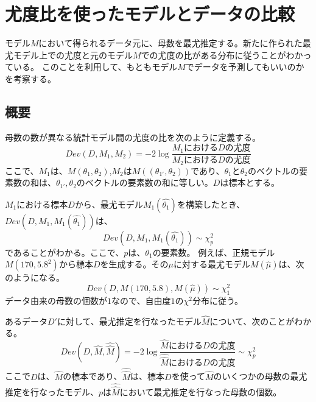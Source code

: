 \chapter{尤度比を使ったモデルとデータの比較}
モデル$M$において得られるデータ元に、母数を最尤推定する。新たに作られた最尤モデル上での尤度と元のモデル$M$での尤度の比がある分布に従うことがわかっている。
このことを利用して、もともモデル$M$でデータを予測してもいいのかを考察する。
\section{概要}

\begin{defi}
    母数の数が異なる統計モデル間の尤度の比を次のように定義する。
    \begin{equation*}
        Dev(D,M_1,M_2) = -2\log\frac{M_1におけるDの尤度}{M_2におけるDの尤度}
    \end{equation*}
    ここで、$M_1$は、$M(\theta_1,\theta_2)$,$M_2$は$M((\theta_{1'},\theta_2))$であり、$\theta_1$と$\theta_2$のベクトルの要素数の和は、$\theta_{1'},\theta_2$のベクトルの要素数の和に等しい。$D$は標本とする。

\end{defi}

$M_1$における標本$D$から、最尤モデル$M_1(\hat{\theta_1})$を構築したとき、$Dev(D,M_1,M_1(\hat{\theta_1}))$は、
\begin{equation*}
    Dev(D,M_1,M_1(\hat{\theta_1})) \sim \chi^2_{p}
\end{equation*}
であることがわかる。ここで、$p$は、$\theta_1$の要素数。
例えば、正規モデル$M(170,5.8^2)$から標本$D$を生成する。その$\mu$に対する最尤モデル$M(\hat{\mu})$は、次のようになる。
\begin{equation*}
    Dev(D,M(170,5.8),M(\hat{\mu})) \sim \chi^2_1
\end{equation*}
データ由来の母数の個数が$1$なので、自由度$1$の$\chi^2$分布に従う。

あるデータ$D'$に対して、最尤推定を行なったモデル$\hat{M}$について、次のことがわかる。
\begin{equation*}
    Dev(D,\hat{M},\hat{\hat{M}}) = -2\log\frac{\hat{M}におけるDの尤度}{\hat{\hat{M}}におけるDの尤度} \sim \chi^2_{p}
\end{equation*}
ここで$D$は、$\hat{M}$の標本であり、$\hat{\hat{M}}$は、標本$D$を使って$\hat{M}$のいくつかの母数の最尤推定を行なったモデル、$p$は$\hat{\hat{M}}$において最尤推定を行なった母数の個数。


